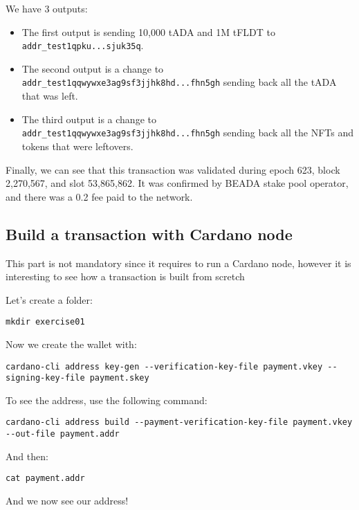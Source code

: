 We have 3 outputs:

\begin{itemize}
    \item The first output is sending 10,000 tADA and 1M tFLDT to \texttt{addr\_test1qpku...sjuk35q}.
    \item The second output is a change to \texttt{addr\_test1qqwywxe3ag9sf3jjhk8hd...fhn5gh} sending back all the tADA that was left.
    \item The third output is a change to \texttt{addr\_test1qqwywxe3ag9sf3jjhk8hd...fhn5gh} sending back all the NFTs and tokens that were leftovers.
\end{itemize}

Finally, we can see that this transaction was validated during \gls{epoch} 623, \gls{block} 2,270,567, and \gls{slot} 53,865,862.
It was confirmed by BEADA stake pool operator, and there was a 0.2 fee paid to the network.

\subsection{Build a transaction with Cardano node}

This part is not mandatory since it requires to run a Cardano node, however it is interesting to see how a transaction is built from scretch


Let's create a folder:

\begin{lstlisting}
mkdir exercise01
\end{lstlisting}

Now we create the wallet with:

\begin{lstlisting}
cardano-cli address key-gen --verification-key-file payment.vkey --signing-key-file payment.skey
\end{lstlisting}

To see the address, use the following command:

\begin{lstlisting}
cardano-cli address build --payment-verification-key-file payment.vkey --out-file payment.addr
\end{lstlisting}

And then:

\begin{lstlisting}
cat payment.addr
\end{lstlisting}

And we now see our address!

